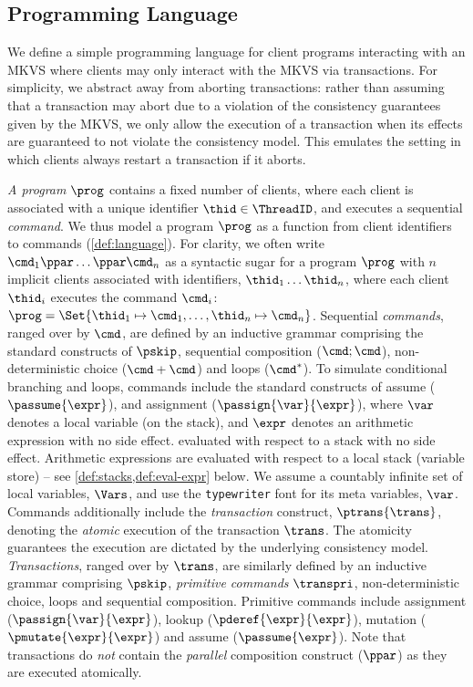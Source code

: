 \subsection{Programming Language}

We define a simple programming language for client programs interacting with an MKVS where clients may only interact with the MKVS via transactions. 
For simplicity, we abstract away from aborting transactions: rather than assuming that a transaction may abort due to a violation of the consistency guarantees given by the MKVS, we only allow the execution of a transaction when its effects are guaranteed to not violate the consistency model. This emulates the setting in which clients always restart a transaction if it aborts.
 
\emph{A program} \( \prog \) contains a fixed number of clients, where each client is associated with a unique identifier \( \thid \in \ThreadID \), and executes a sequential \emph{command}.
We thus model a program $\prog$ as a function from client identifiers  to commands (\cref{def:language}).
For clarity, we often write \( \cmd_{1}\ppar \dots \ppar \cmd_{n}\) as a syntactic sugar for a program \( \prog \) with $n$ implicit clients associated with identifiers, $\thid_1 \dots \thid_n$, where each client $\thid_i$ executes the command $\cmd_i$:  \( \prog = \Set{\thid_{1} \mapsto \cmd_{1}, \dots, \thid_{n} \mapsto \cmd_{n}  }\).
Sequential \emph{commands}, ranged over by $\cmd$, are defined by an inductive grammar comprising the standard constructs of $\pskip$, sequential composition ($\cmd; \cmd$), non-deterministic choice ($\cmd+\cmd$) and loops ($\cmd^*$).
To simulate conditional branching and loops, commands include the standard constructs of assume (\( \passume{\expr}\)), and assignment (\( \passign{\var}{\expr} \)), where \( \var \) denotes a local variable (on the stack), and \( \expr \) denotes an arithmetic expression with no side effect.  
evaluated with respect to a stack  with no side effect.
Arithmetic expressions are evaluated with respect to a local stack (variable store) -- see  \cref{def:stacks,def:eval-expr} below.
We assume a countably infinite set of local variables, $\Vars $, and use the \texttt{typewriter} font for its meta variables, \eg $\var$.\\
%
\indent Commands additionally include the \emph{transaction} construct, $\ptrans{\trans}$, denoting the \emph{atomic} execution of the transaction $\trans$. 
The atomicity guarantees the execution are dictated by the underlying consistency model.
\emph{Transactions}, ranged over by $\trans$, are similarly defined by an inductive grammar comprising $\pskip$, \emph{primitive commands} \( \transpri \), non-deterministic choice, loops and sequential composition.
Primitive commands include assignment (\( \passign{\var}{\expr}\)), lookup (\( \pderef{\expr}{\expr}\)), mutation (\( \pmutate{\expr}{\expr}\)) and assume (\( \passume{\expr}\)). 
Note that transactions do \emph{not} contain the \emph{parallel} composition construct ($\ppar$) as they are executed atomically.

